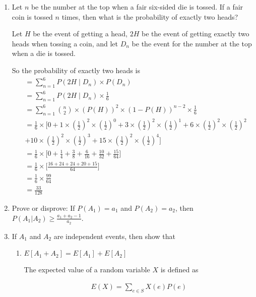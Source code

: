 \begin{enumerate}
\item \relax[3 points] Let $n$ be the number at the top when a fair
  six-sided die is tossed. If a fair coin is tossed $n$ times, then
  what is the probability of exactly two heads?

Let $H$ be the event of getting a head, $2H$ be the event of getting exactly two heads when tossing a coin, and let $D_n$ be the event for the number at the top when a die is tossed.

So the probability of exactly two heads is
\begin{equation*}
\begin{aligned}
&= \sum_{n=1}^6  P(2H \mid D_n) \times P(D_n)\\
&= \sum_{n=1}^6  P(2H \mid D_n) \times \frac{1}{6}\\
&= \sum_{n=1}^6  {n \choose 2} \times \left( P(H) \right ) ^ 2  \times \left(1- P(H) \right ) ^ {n-2} \times \frac{1}{6}\\
&= \frac{1}{6} \times \bigl [ 0 +  1 \times \left(\frac{1}{2} \right)^2 \times \left (\frac{1}{2}\right )^0 + 3 \times \left(\frac{1}{2} \right)^2 \times \left (\frac{1}{2}\right )^1 + 6 \times \left(\frac{1}{2} \right)^2 \times \left (\frac{1}{2}\right )^2 \\
&+10 \times \left(\frac{1}{2} \right)^2 \times \left (\frac{1}{2}\right )^3  + 15 \times \left(\frac{1}{2} \right)^2 \times \left (\frac{1}{2}\right )^4 \bigr ]\\
&= \frac{1}{6} \times \bigl [ 0 +  \frac{1}{4} + \frac{3}{8} + \frac{6}{16} + \frac{10}{32} + \frac{15}{64}\bigr ]\\
&= \frac{1}{6} \times \bigl [ \frac{16+24+ 24+20+15}{64}\bigr ]\\
&=\frac{1}{6} \times\frac{99}{64} \\
&=\frac{33}{128}
\end{aligned}   
\end{equation*}  
  
\item \relax[4 points] Prove or disprove: If $P(A_1) = a_1$ and
  $P(A_2) = a_2$, then $P(A_1 | A_2) \geq \frac{a_1 + a_2 -1}{a_2}$.
\item \relax[8 points] If $A_1$ and $A_2$ are independent events, then
  show that
  \begin{enumerate}
  \item $E[A_1 + A_2] = E[A_1] + E[A_2]$

The expected value of a random variable $X$ is defined as 

\begin{equation*}
\begin{aligned}
E(X) = \sum_{e \in S} X(e) P(e)
\end{aligned}
\end{equation*} 


\end{enumerate}
\end{enumerate}
